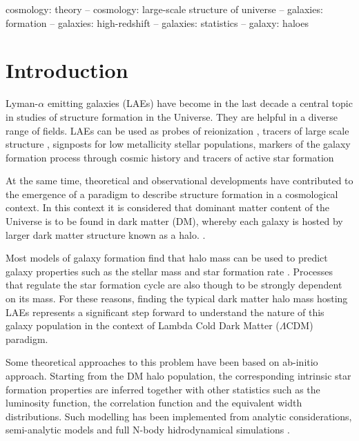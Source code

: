 \documentclass[usenatbib]{mn2e}
\begin{document}
\begin{keywords}
{cosmology: theory – cosmology: large-scale structure of universe –
  galaxies: formation – galaxies: high-redshift – galaxies: statistics
  – galaxy: haloes} 
\end{keywords}


\section{Introduction}

Lyman-$\alpha$ emitting galaxies (LAEs) have become in the last decade
a  central topic in studies of structure formation in the Universe. They 
are helpful in a diverse range of fields. LAEs can be used as probes
of reionization \citep{Dijkstra11}, tracers of large scale structure
\citep{Koehler2007},  signposts for low metallicity stellar
populations, markers of the galaxy formation process through
cosmic history \citep{ForeroRomero2012} and tracers of active star
formation  \citep{Guaita2013}

At the same time, theoretical and observational developments have
contributed to the emergence of a paradigm to describe structure
formation in a cosmological context. In this context it is considered
that dominant matter content of the Universe is to be found in dark
matter (DM), whereby each galaxy is hosted by larger dark matter structure
known as a halo. \citep{Peebles1980,SpringelNature05}.

Most models of galaxy formation find that halo mass can be
used to predict galaxy properties such as the stellar mass and
star formation rate \citep{Behroozi2012}. Processes that regulate the
star formation cycle are also though to be strongly dependent on its
mass.  For these reasons, finding the typical dark matter halo mass
hosting LAEs represents a significant step forward to understand the
nature of this galaxy population in the context of Lambda Cold Dark
Matter ($\Lambda$CDM) paradigm.    

Some theoretical approaches to this problem have been based on
ab-initio approach. Starting from the DM halo population, the
corresponding intrinsic star formation properties are inferred
together with other statistics such as the luminosity function, the
correlation function and the equivalent width distributions. Such
modelling has been implemented from analytic considerations,
semi-analytic models  and  full N-body hidrodynamical simulations
\citep{Laursen2007, Dayal2009, ForeroRomero2011, Yajima2012, Orsi2012, Soler2012}. 
\end{document}
